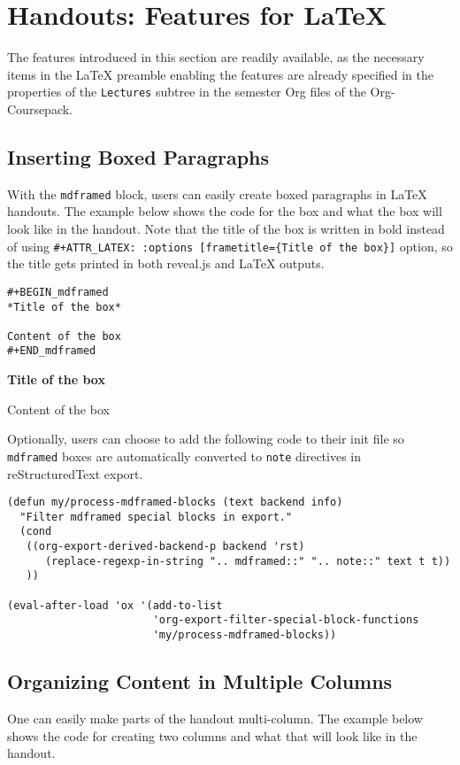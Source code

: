 \documentclass[10pt,article]{article}
\begin{document}
\section{Handouts: Features for \LaTeX{}}
\label{sec:orgf8a08f7}
The features introduced in this section are readily available, as the
necessary items in the \LaTeX{} preamble enabling the features are already
specified in the properties of the \texttt{Lectures} subtree in the semester Org
files of the Org-Coursepack.
\subsection{Inserting Boxed Paragraphs}
\label{sec:orgfec3c98}
With the \texttt{mdframed} block, users can easily create boxed paragraphs in \LaTeX{} 
handouts. The example below shows the code for the box and what the box will
look like in the handout. Note that the title of the box is written in bold
instead of using \texttt{\#+ATTR\_LATEX: :options [frametitle=\{Title of the box\}]}
option, so the title gets printed in both reveal.js and \LaTeX{} outputs.

\begin{verbatim}
#+BEGIN_mdframed
*Title of the box*

Content of the box
#+END_mdframed
\end{verbatim}

\begin{mdframed}
\textbf{Title of the box}

Content of the box
\end{mdframed}

Optionally, users can choose to add the following code to their init file so
\texttt{mdframed} boxes are automatically converted to \texttt{note} directives in
reStructuredText export.

{\small
\begin{verbatim}
(defun my/process-mdframed-blocks (text backend info)
  "Filter mdframed special blocks in export."
  (cond
   ((org-export-derived-backend-p backend 'rst)
      (replace-regexp-in-string ".. mdframed::" ".. note::" text t t))
   ))

(eval-after-load 'ox '(add-to-list
                       'org-export-filter-special-block-functions
                       'my/process-mdframed-blocks))
\end{verbatim}
}
\subsection{Organizing Content in Multiple Columns}
\label{sec:org724ce29}
One can easily make parts of the handout multi-column. The example
below shows the code for creating two columns and what that will look like in
the handout.
\end{document}

